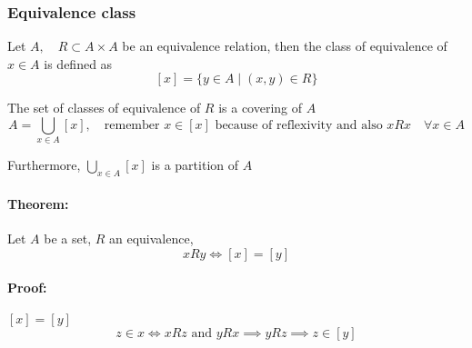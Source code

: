 \documentclass[11pt]{article}
\begin{document}
\subsubsection{Equivalence class}
Let $A, \quad R \subset A \times A$ be an equivalence relation, then the class of equivalence of $x \in A$ is defined as 
\[
[x] = \{y \in A \mid (x,y) \in R\}
\]

The set of classes of equivalence of $R$ is a covering of $A$
\[
A = \bigcup_{x \in A}[x], \quad \text{remember } x \in [x] \text{ because of reflexivity and also } xRx \quad \forall x \in A
\]

Furthermore, $\bigcup_{x \in A}[x]$ is a partition of $A$

\paragraph{Theorem:} Let $A$ be a set, $R$ an equivalence,
\[
xRy \Longleftrightarrow [x] = [y]
\]

\paragraph{Proof:} $[x] = [y]$
\[
z \in x \Longleftrightarrow xRz \text{ and } yRx \implies yRz \implies z \in [y]
\]
\end{document}
